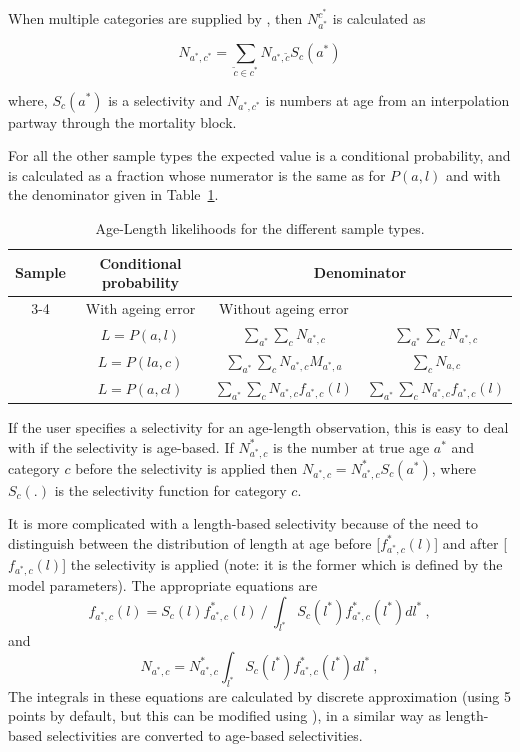 When multiple categories are supplied by , then \(N^{c^*}_{a^*}\) is calculated as

\[
N_{a^*,c^*} = \sum\limits_{\tilde{c} \in c^*} N_{a^*,\tilde{c}} S_c(a^*)
\]

where, \(S_c(a^*)\) is a selectivity and \(N_{a^*,c^*}\) is numbers at age from an interpolation partway through the mortality block.

For all the other sample types the expected value is a conditional probability, and is calculated as a fraction whose numerator is the same as for \(P(a,l) \) and with the denominator given in Table~\ref{tab:agelength:likelihoods}.

\begin{table}[h!]
	\centering
	\caption{Age-Length likelihoods for the different sample types.}
	\label{tab:agelength:likelihoods}
	\begin{tabular}{c c c c} 
		Sample & Conditional probability & \multicolumn{2}{c}{Denominator} \\
		\cline{3-4}
		\multicolumn{2}{c}{} & With ageing error & Without ageing error\\
		\hline
		\subcommand{random} &\(L = P(a,l) \) & \(\sum_{a^*}\sum_{c} N_{a^*,c}\) & \(\sum_{a^*}\sum_{c} N_{a^*,c}\) \\ 
		\subcommand{by\_age} & \(L = P(l a,c) \) & \(\sum_{a^*}\sum_{c} N_{a^*,c}M_{a^*,a}\) & \(\sum_{c} N_{a,c}\) \\
		\subcommand{by\_length} & \(L = P(a,c l) \) & \(\sum_{a^*}\sum_{c} N_{a^*,c}f_{a^*,c}(l)\) &  \(\sum_{a^*}\sum_{c} N_{a^*,c}f_{a^*,c}(l)\)  \\
	\end{tabular}
\end{table}

If the user specifies a selectivity for an age-length observation, this is easy to deal with if the selectivity is age-based. If \(N^*_{a^*,c}\) is the number at true age \(a^*\) and category \(c\) before the selectivity is applied then \(N_{a^*,c} = N^*_{a^*,c}S_c(a^*)\), where \(S_c(.)\) is the selectivity function for category \(c\).

It is more complicated with a length-based selectivity because of the need to distinguish between the distribution of length at age before [\(f^*_{a^*,c}(l)\)] and after [\(f_{a^*,c}(l)\)] the selectivity is applied (note: it is the former which is defined by the model parameters). The appropriate equations are
\[
f_{a^*,c}(l) = S_c(l)f^*_{a^*,c}(l) \ / \ \int_{l^*} S_c(l^*)f^*_{a^*,c}(l^*) dl^* \ ,
\]
and 
\[
N_{a^*,c} = N^*_{a^*,c} \int_{l^*} S_c(l^*)f^*_{a^*,c}(l^*) dl^* \ ,
\]
The integrals in these equations are calculated by discrete approximation (using 5 points by default, but this can be modified using ), in a similar way as length-based selectivities are converted to age-based selectivities.

